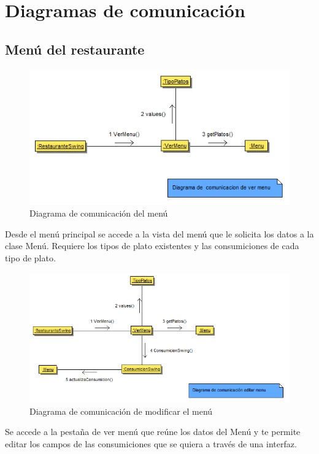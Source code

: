 \documentclass[spanish,a4paper,11pt, twoside]{report}	%
\begin{document}
	\section{Diagramas de comunicación}
		\subsection{Menú del restaurante}

		\begin{figure}[!h]
		\centering
		\includegraphics[scale=0.7]{DCvermenu.png}
		\caption{Diagrama de comunicación del menú}
		\end{figure}
		Desde el menú principal se accede a la vista del menú que le solicita los datos a la clase Menú.
		Requiere los tipos de plato existentes y las consumiciones de cada tipo de plato. 

		\begin{figure}[!h]
		\centering
		\includegraphics[scale=0.65]{DCeditarmenu.png}
		\caption{Diagrama de comunicación de modificar el menú}
		\end{figure}
		Se accede  a la pestaña de ver menú que reúne los datos del Menú y te
		permite editar los campos de las consumiciones que se quiera a través de una
		interfaz.
\end{document}
